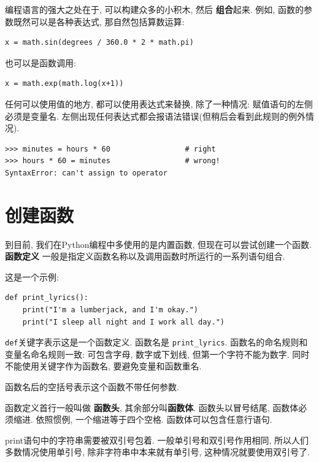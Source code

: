 \documentclass[10pt]{book}
\begin{document}
编程语言的强大之处在于, 可以构建众多的小积木, 然后 {\bf 组合}起来. 
例如, 函数的参数既然可以是各种表达式, 那自然包括算数运算:

\begin{verbatim}
x = math.sin(degrees / 360.0 * 2 * math.pi)
\end{verbatim}
%
也可以是函数调用:

\begin{verbatim}
x = math.exp(math.log(x+1))
\end{verbatim}
%
任何可以使用值的地方, 都可以使用表达式来替换, 除了一种情况:
赋值语句的左侧必须是变量名. 
左侧出现任何表达式都会报语法错误(但稍后会看到此规则的例外情况). 

\begin{verbatim}
>>> minutes = hours * 60                 # right
>>> hours * 60 = minutes                 # wrong!
SyntaxError: can't assign to operator
\end{verbatim}
%


\section{创建函数}

到目前, 我们在Python编程中多使用的是内置函数, 但现在可以尝试创建一个函数. 
{\bf 函数定义} 一般是指定义函数名称以及调用函数时所运行的一系列语句组合. 

这是一个示例:

\begin{verbatim}
def print_lyrics():
    print("I'm a lumberjack, and I'm okay.")
    print("I sleep all night and I work all day.")
\end{verbatim}
%

{\tt def}关键字表示这是一个函数定义. 
函数名是 \verb"print_lyrics". 
函数名的命名规则和变量名命名规则一致: 
可包含字母, 数字或下划线, 但第一个字符不能为数字. 
同时不能使用关键字作为函数名, 要避免变量和函数重名. 

函数名后的空括号表示这个函数不带任何参数. 

函数定义首行一般叫做 {\bf 函数头}, 其余部分叫{\bf 函数体}.
函数头以冒号结尾, 函数体必须缩进. 
依照惯例, 一个缩进等于四个空格. 
函数体可以包含任意行语句. 

print语句中的字符串需要被双引号包着. 
一般单引号和双引号作用相同, 所以人们多数情况使用单引号, 
除非字符串中本来就有单引号, 这种情况就要使用双引号了. 
\end{document}
